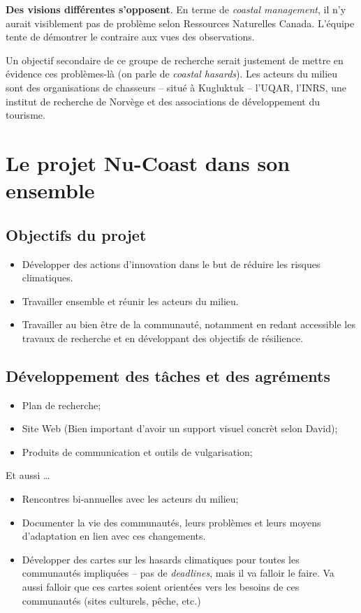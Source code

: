 \documentclass[10pt]{article}
\numberwithin{equation}{section}
\begin{document}
\textbf{Des visions différentes s'opposent}. En terme de \emph{coastal management}, il n'y aurait visiblement pas de problème selon Ressources Naturelles Canada. L'équipe tente de démontrer le contraire aux vues des observations.

Un objectif secondaire de ce groupe de recherche serait justement de mettre en évidence ces problèmes-là (on parle de \emph{coastal hasards}). Les acteurs du milieu sont des organisations de chasseurs -- situé à Kugluktuk -- l'UQAR, l'INRS, une institut de recherche de Norvège et des associations de développement du tourisme.
\section{Le projet Nu-Coast dans son ensemble}
\label{sec:org557eed4}

\subsection{Objectifs du projet}
\label{sec:org4f823cf}

\begin{itemize}
\item Développer des actions d'innovation dans le but de réduire les risques climatiques.
\item Travailler ensemble et réunir les acteurs du milieu.
\item Travailler au bien être de la communauté, notamment en redant accessible les travaux de recherche et en développant des objectifs de résilience.
\end{itemize}
\subsection{Développement des tâches et des agréments}
\label{sec:org4cf8779}

\begin{itemize}
\item Plan de recherche;
\item Site Web (Bien important d'avoir un support visuel concrèt selon David);
\item Produits de communication et outils de vulgarisation;
\end{itemize}

Et aussi \ldots{} 
\begin{itemize}
\item Rencontres bi-annuelles avec les acteurs du milieu;
\item Documenter la vie des communautés, leurs problèmes et leurs moyens d'adaptation en lien avec ces changements.
\item Développer des cartes sur les hasards climatiques pour toutes les communautés impliquées -- pas de \emph{deadlines}, mais il va falloir le faire.
Va aussi falloir que ces cartes soient orientées vers les besoins de ces communautés (sites culturels, pêche, etc.)
\end{itemize}
\end{document}

